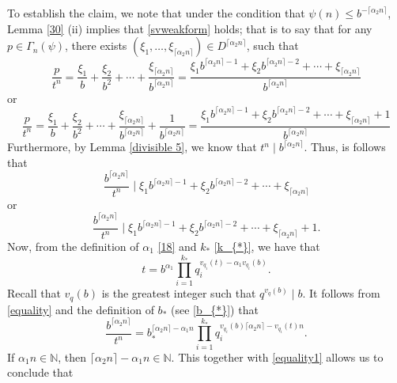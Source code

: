 \documentclass[12pt]{article}
\theoremstyle{definition}
\theoremstyle{remark}
\newcommand{\red}[1]{\textcolor[rgb]{1.00,0.00,0.00}{#1}}
\newcommand{\sv}[1]{{\color{blue}   {#1}}}
\begin{document}
To establish the claim,  we note that under the  condition that $\psi(n)\leq  b^{-\lceil\alpha_{2}n\rceil}$,  Lemma \ref{30} (ii) implies that   \eqref{svweakform} holds; that is to say that for any $p\in\Gamma_{n}(\psi)$, there exists $(\xi_{1},\ldots,\xi_{\lceil\alpha_{2}n\rceil})\in D^{\lceil\alpha_{2}n\rceil}$, such that
$$\frac{p}{t^{n}}=\frac{\xi_{1}}{b}+\frac{\xi_{2}}{b^{2}}+\cdots+\frac{\xi_{\lceil\alpha_{2}n\rceil}}{b^{\lceil\alpha_{2}n\rceil}}=\frac{\xi_{1}b^{\lceil\alpha_{2}n\rceil-1}+\xi_{2}b^{\lceil\alpha_{2}n\rceil-2}+\cdots+\xi_{\lceil\alpha_{2}n\rceil}}{b^{\lceil\alpha_{2}n\rceil}}$$
or
$$\frac{p}{t^{n}}=\frac{\xi_{1}}{b}+\frac{\xi_{2}}{b^{2}}+\cdots+\frac{\xi_{\lceil\alpha_{2}n\rceil}}{b^{\lceil\alpha_{2}n\rceil}}+\frac{1}{b^{\lceil\alpha_{2}n\rceil}}=\frac{\xi_{1}b^{\lceil\alpha_{2}n\rceil-1}+\xi_{2}b^{\lceil\alpha_{2}n\rceil-2}+\cdots+\xi_{\lceil\alpha_{2}n\rceil}+1}{b^{\lceil\alpha_{2}n\rceil}}$$
Furthermore, by Lemma \ref{divisible 5}, we know that $t^{n}\mid b^{\lceil\alpha_{2}n\rceil}$. 
Thus, is follows that 
$$\frac{b^{\lceil\alpha_{2}n\rceil}}{t^{n}} \mid \xi_{1}b^{\lceil\alpha_{2}n\rceil-1}+\xi_{2}b^{\lceil\alpha_{2}n\rceil-2}+\cdots+\xi_{\lceil\alpha_{2}n\rceil}  $$
or
$$\frac{b^{\lceil\alpha_{2}n\rceil}}{t^{n}}\mid \xi_{1}b^{\lceil\alpha_{2}n\rceil-1}+\xi_{2}b^{\lceil\alpha_{2}n\rceil-2}+\cdots+\xi_{\lceil\alpha_{2}n\rceil}+1.$$
Now, from the definition of $\alpha_{1}$ \eqref{18} and $k_{*}$ \eqref{k_{*}}, we have  that
\begin{equation}\label{equality}
t=b^{\alpha_{1}}\prod_{i=1}^{k_{*}}q_{i}^{v_{q_{i}}(t)-\alpha_{1}v_{q_{i}}(b)}.
\end{equation}
Recall that $v_{q}(b)$ is the greatest integer such that $q^{v_{q}(b)}\mid b$. It follows from \eqref{equality} and the definition of $b_{*}$ (see \eqref{b_{*}}) that
\begin{equation}\label{equality1}
\frac{b^{\lceil\alpha_{2}n\rceil}}{t^{n}}=b_{*}^{\lceil\alpha_{2}n\rceil-\alpha_{1}n}\prod_{i=1}^{k_{*}}q_{i}^{v_{q_{i}}(b)\lceil\alpha_{2}n\rceil-v_{q_{i}}(t)n}.
\end{equation}
If $\alpha_{1}n\in\mathbb{N}$, then 
$\lceil\alpha_{2}n\rceil-\alpha_{1}n\in\mathbb{N}$.  This together with \eqref{equality1} allows us to conclude that
\end{document}

